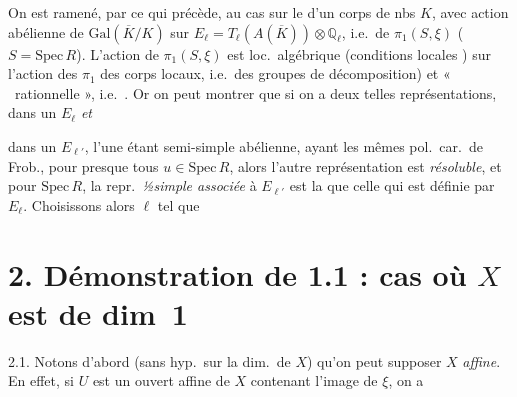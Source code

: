 \documentclass[11pt,a4paper]{article}
\begin{document}
On est ramené, par ce qui précède, au cas   sur le   d'un corps de nbs $K$, avec action abélienne de $\mathrm{Gal}(\overline{K}/K)$ sur $E_\ell = T_\ell(A(\overline{K})) \otimes \mathbb{Q}_\ell$, i.e.\ de $\pi_1(S,\xi)$ ($S = \mathrm{Spec}\, R$). L'action de $\pi_1(S,\xi)$ est loc.\ algébrique (conditions locales ) sur l'action des $\pi_1$ des corps locaux, i.e.\ des groupes de \struck{\ill{}} décomposition) et « \ rationnelle », i.e.\ . Or on peut montrer que si on a deux telles représentations, dans un $E_\ell$ \emph{et}

dans un $E_{\ell'}$, l'une étant semi-simple abélienne,   ayant les mêmes pol.\ car.\ de Frob., pour presque tous $u \in \mathrm{Spec}\, R$, alors l'autre représentation est \emph{résoluble},  et pour \ill{} $\mathrm{Spec}\, R$, la repr.\ \emph{½simple associée} à $E_{\ell'}$ \struck{\ill{}} est la  que celle qui est définie par $E_\ell$. Choisissons alors $\ell$ tel que


\section*{2. Démonstration de 1.1 : cas où $X$ est de dim~1}


2.1. Notons d'abord (sans hyp.\ sur la dim.\ de $X$\struck{, \ill{} \ill{}}) qu'on peut supposer $X$ \emph{affine}. En effet, si $U$ est un ouvert affine \struck{\ill{}} de $X$ contenant l'image de $\xi$, on a  
\end{document}
